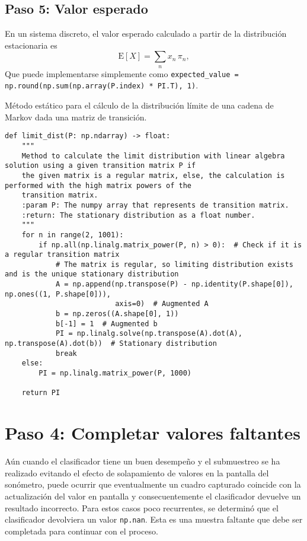 \subsection*{Paso 5: Valor esperado}
\label{subsec:expected_value}

En un sistema discreto, el valor esperado calculado a partir de la distribución estacionaria es
%
\begin{equation}
    \mathrm{E}[X] = \sum_n x_n\,\pi_n,
\end{equation}
%
Que puede implementarse simplemente como \texttt{expected_value = np.round(np.sum(np.array(P.index) * PI.T), 1)}.

\begin{code}
    \caption{Método estático para el cálculo de la distribución límite de una cadena de Markov dada una matriz de transición.}
    \label{code:limit_dist}
    \centering
    \begin{verbatim}
def limit_dist(P: np.ndarray) -> float:
    """
    Method to calculate the limit distribution with linear algebra solution using a given transition matrix P if
    the given matrix is a regular matrix, else, the calculation is performed with the high matrix powers of the
    transition matrix.
    :param P: The numpy array that represents de transition matrix.
    :return: The stationary distribution as a float number.
    """
    for n in range(2, 1001):
        if np.all(np.linalg.matrix_power(P, n) > 0):  # Check if it is a regular transition matrix
            # The matrix is regular, so limiting distribution exists and is the unique stationary distribution
            A = np.append(np.transpose(P) - np.identity(P.shape[0]), np.ones((1, P.shape[0])),
                          axis=0)  # Augmented A
            b = np.zeros((A.shape[0], 1))
            b[-1] = 1  # Augmented b
            PI = np.linalg.solve(np.transpose(A).dot(A), np.transpose(A).dot(b))  # Stationary distribution
            break
    else:
        PI = np.linalg.matrix_power(P, 1000)

    return PI
    \end{verbatim}
\end{code}

\section*{Paso 4: Completar valores faltantes}
\label{sec:fill_missing_values}
Aún cuando el clasificador tiene un buen desempeño y el submuestreo se ha realizado evitando el efecto de solapamiento de valores en la pantalla del sonómetro, puede ocurrir que eventualmente un cuadro capturado coincide con la actualización del valor en pantalla y consecuentemente el clasificador devuelve un resultado incorrecto.
Para estos casos poco recurrentes, se determinó que el clasificador devolviera un valor \texttt{\small np.nan}.
Esta es una muestra faltante que debe ser completada para continuar con el proceso.

